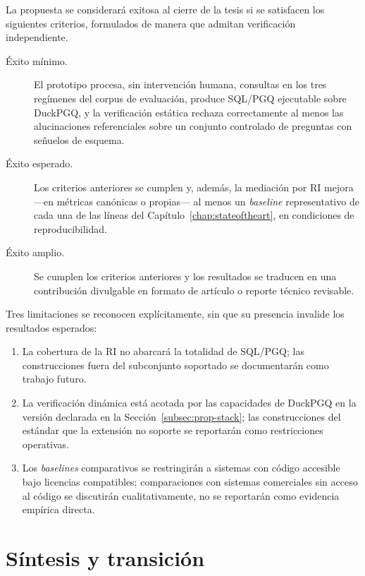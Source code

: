 La propuesta se considerará exitosa al cierre de la tesis si se satisfacen los siguientes criterios, formulados de manera que admitan verificación independiente.

\begin{description}
    \item[Éxito mínimo.] El prototipo procesa, sin intervención humana, consultas en los tres regímenes del corpus de evaluación, produce \ac{SQL}/\ac{PGQ} ejecutable sobre DuckPGQ, y la verificación estática rechaza correctamente al menos las alucinaciones referenciales sobre un conjunto controlado de preguntas con señuelos de esquema.
    \item[Éxito esperado.] Los criterios anteriores se cumplen y, además, la mediación por \ac{RI} mejora ---en métricas canónicas o propias--- al menos un \emph{baseline} representativo de cada una de las líneas del Capítulo~\ref{chap:stateoftheart}, en condiciones de reproducibilidad.
    \item[Éxito amplio.] Se cumplen los criterios anteriores y los resultados se traducen en una contribución divulgable en formato de artículo o reporte técnico revisable.
\end{description}

Tres limitaciones se reconocen explícitamente, sin que su presencia invalide los resultados esperados:

\begin{enumerate}
    \item La cobertura de la \ac{RI} no abarcará la totalidad de \ac{SQL}/\ac{PGQ}; las construcciones fuera del subconjunto soportado se documentarán como trabajo futuro.
    \item La verificación dinámica está acotada por las capacidades de DuckPGQ en la versión declarada en la Sección~\ref{subsec:prop-stack}; las construcciones del estándar que la extensión no soporte se reportarán como restricciones operativas.
    \item Los \emph{baselines} comparativos se restringirán a sistemas con código accesible bajo licencias compatibles; comparaciones con sistemas comerciales sin acceso al código se discutirán cualitativamente, no se reportarán como evidencia empírica directa.
\end{enumerate}

\section{Síntesis y transición}
\label{sec:prop-sintesis}

